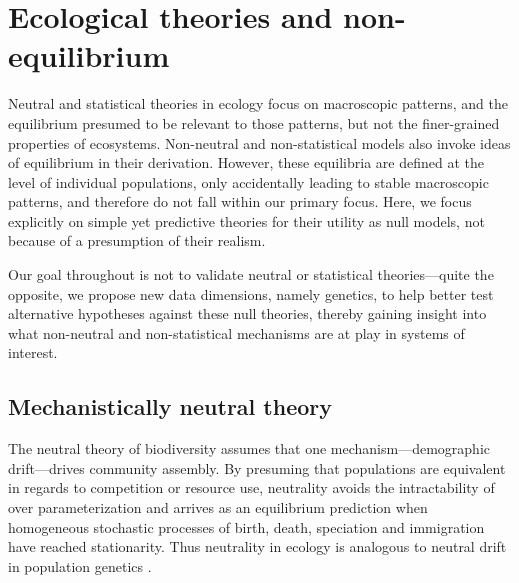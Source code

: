 \documentclass[12pt]{article}
\begin{document}
\section{Ecological theories and non-equilibrium}

Neutral and statistical theories in ecology focus on macroscopic
patterns, and the equilibrium presumed to be relevant to those
patterns, but not the finer-grained properties of ecosystems. Non-neutral and
non-statistical models \citep[e.g.,][]{Tilman2004-xt, Chesson2000-uc}
also invoke ideas of equilibrium in their derivation. However, these
equilibria are defined at the level of individual populations,
only accidentally leading to stable macroscopic patterns, and therefore do not
fall within our primary focus.  Here, we focus explicitly on simple yet
predictive theories for their utility as null models, not because of a
presumption of their realism.

Our goal throughout is not to validate neutral or statistical
theories---quite the opposite, we propose new data dimensions, namely
genetics, to help better test alternative hypotheses against these
null theories, thereby gaining insight into what non-neutral and
non-statistical mechanisms are at play in systems of interest.

\subsection{Mechanistically neutral theory}

The neutral theory of biodiversity \citep[NTB;][]{Hubbell2001-dx}
assumes that one mechanism---demographic drift---drives community
assembly. By presuming that populations are equivalent in regards to competition or resource use,
% 
% 
%
%
neutrality avoids the intractability of over
parameterization and arrives as an equilibrium prediction when
homogeneous stochastic processes of birth, death, speciation and
immigration have reached stationarity. Thus neutrality in ecology is
analogous to neutral drift in population genetics
\citep{Hubbell2001-dx}.
\end{document}
